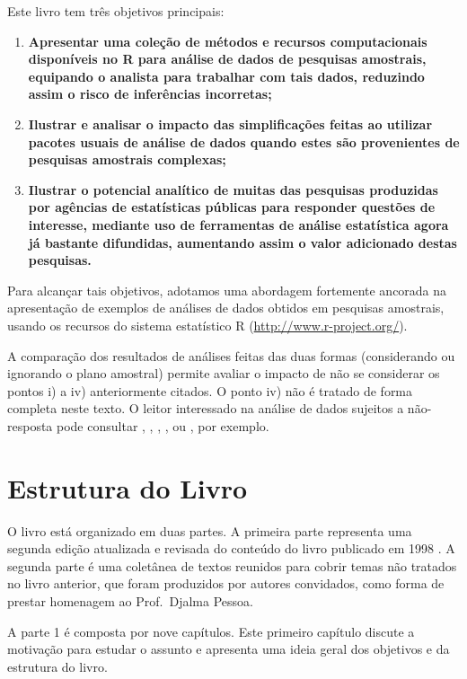 \documentclass[
]{book}
\begin{document}
Este livro tem três objetivos principais:

\begin{enumerate}
\def\labelenumi{\arabic{enumi})}
\item
  \textbf{Apresentar uma coleção de métodos e recursos computacionais disponíveis no R para análise de dados de pesquisas amostrais, equipando o analista para trabalhar com tais dados, reduzindo assim o risco de inferências incorretas;}
\item
  \textbf{Ilustrar e analisar o impacto das simplificações feitas ao utilizar pacotes usuais de análise de dados quando estes são provenientes de pesquisas amostrais complexas;}
\item
  \textbf{Ilustrar o potencial analítico de muitas das pesquisas produzidas por agências de estatísticas públicas para responder questões de interesse, mediante uso de ferramentas de análise estatística agora já bastante difundidas, aumentando assim o valor adicionado destas pesquisas.}
\end{enumerate}

Para alcançar tais objetivos, adotamos uma abordagem fortemente ancorada na
apresentação de exemplos de análises de dados obtidos em pesquisas amostrais, usando os recursos do sistema estatístico R (\url{http://www.r-project.org/}).

A comparação dos resultados de análises feitas das duas formas (considerando ou
ignorando o plano amostral) permite avaliar o impacto de não se considerar os pontos i) a iv) anteriormente citados. O ponto iv) não é tratado de forma completa neste texto. O leitor interessado na análise de dados sujeitos a não-resposta pode consultar \citep{kalton83a}, \citep{LR2002}, \citep{Rubin87}, \citep{SSW92}, ou \citep{Schafer1997}, por exemplo.

\hypertarget{estrutura-do-livro}{%
\section{Estrutura do Livro}\label{estrutura-do-livro}}

O livro está organizado em duas partes. A primeira parte representa uma segunda edição atualizada e revisada do conteúdo do livro publicado em 1998 \citep{Pessoa1998}. A segunda parte é uma coletânea de textos reunidos para cobrir temas não tratados no livro anterior, que foram produzidos por autores convidados, como forma de prestar homenagem ao Prof.~Djalma Pessoa.

A parte 1 é composta por nove capítulos. Este primeiro capítulo discute a motivação para estudar o assunto e apresenta uma ideia geral dos objetivos e da estrutura do livro.
\end{document}
